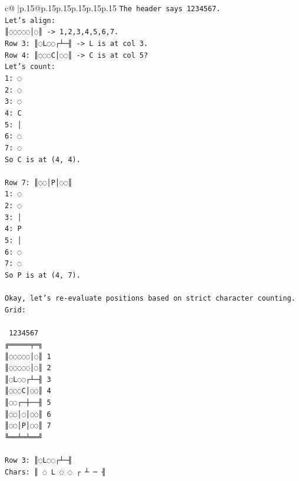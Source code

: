 \documentclass{article}
\begin{document}
{\begin{supertabular}{c@{$\;$}|p{.15\linewidth}@{}p{.15\linewidth}p{.15\linewidth}p{.15\linewidth}p{.15\linewidth}p{.15\linewidth}}
{{{\texttt{The header says 1234567.} \\
\texttt{Let's align:} \\
\texttt{║◌◌◌◌◌│◌║ {-}> 1,2,3,4,5,6,7.} \\
\texttt{Row 3: ║◌L◌◌┌┴─╢ {-}> L is at col 3.} \\
\texttt{Row 4: ║◌◌◌C│◌◌║ {-}> C is at col 5?} \\
\texttt{Let's count:} \\
\texttt{1: ◌} \\
\texttt{2: ◌} \\
\texttt{3: ◌} \\
\texttt{4: C} \\
\texttt{5: │} \\
\texttt{6: ◌} \\
\texttt{7: ◌} \\
\texttt{So C is at (4, 4).} \\
\\ 
\texttt{Row 7: ║◌◌│P│◌◌║} \\
\texttt{1: ◌} \\
\texttt{2: ◌} \\
\texttt{3: │} \\
\texttt{4: P} \\
\texttt{5: │} \\
\texttt{6: ◌} \\
\texttt{7: ◌} \\
\texttt{So P is at (4, 7).} \\
\\ 
\texttt{Okay, let's re{-}evaluate positions based on strict character counting.} \\
\texttt{Grid:} \\
\\ 
\texttt{  1234567} \\
\texttt{╔═════╤═╗} \\
\texttt{║◌◌◌◌◌│◌║ 1} \\
\texttt{║◌◌◌◌◌│◌║ 2} \\
\texttt{║◌L◌◌┌┴─╢ 3} \\
\texttt{║◌◌◌C│◌◌║ 4} \\
\texttt{║◌◌┌─┼──╢ 5} \\
\texttt{║◌◌│◌│◌◌║ 6} \\
\texttt{║◌◌│P│◌◌║ 7} \\
\texttt{╚══╧═╧══╝} \\
\\ 
\texttt{Row 3: ║◌L◌◌┌┴─╢} \\
\texttt{Chars: ║ ◌ L ◌ ◌ ┌ ┴ ─ ╢} \\
}}}
\end{supertabular}}
\end{document}
